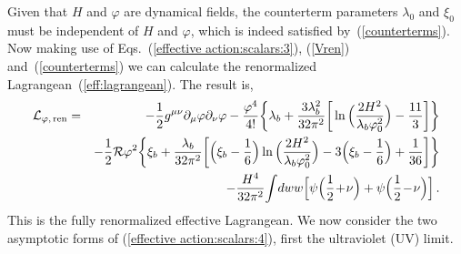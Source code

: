 \documentclass[aps,12pt,superscriptaddress,preprintnumbers,
                secnumarabic,nofootinbib,showpacs]{revtex4}
\begin{document}
Given that $H$ and $\varphi$ are dynamical fields, the counterterm parameters
$\lambda_0$ and $\xi_0$ must be independent of $H$ and $\varphi$,
which is indeed satisfied by~(\ref{counterterms}).
 Now making use of Eqs.~(\ref{effective action:scalars:3}),
(\ref{Vren}) and~(\ref{counterterms}) we can calculate the renormalized
Lagrangean~(\ref{eff:lagrangean}). The result is,
\begin{eqnarray}
 {\cal L}_{\varphi,\, \mathrm{ren}}
  &=& -\frac12g^{\mu\nu}\partial_\mu\varphi\partial_\nu\varphi
      - \frac{\varphi^4}{4!}\bigg\{\lambda_b+\frac{3\lambda_b^{2}}{32\pi^{2}}
      \bigg[\ln\Big(\frac{2H^{2}}{\lambda_b\varphi_0^{2}}\Big)-\frac{11}{3}\bigg]\bigg\}
\nonumber\\
  & &    - \frac12{\cal R}\varphi^2\bigg\{\xi_b+\frac{\lambda_b}{32\pi^{2}}\bigg[\Big(\xi_b-\frac{1}{6}\Big)
                       \ln\Big(\frac{2H^{2}}{\lambda_b\varphi_0^{2}}\Big)
                       -3\Big(\xi_b-\frac{1}{6}\Big)+\frac{1}{36}\bigg]\bigg\}
\nonumber
\\
&&\hskip 0.cm
     - \frac{H^4}{32\pi^2}
        \!\int\! dww
              \Big[\psi\Big(\frac{1}{2}\!+\!\nu\Big)
                              + \psi\Big(\frac{1}{2}\!-\!\nu\Big)\Big]
\,.
\label{effective action:scalars:4}
\end{eqnarray}
This is the fully renormalized effective Lagrangean. We now
consider the two asymptotic forms of (\ref{effective
action:scalars:4}), first the ultraviolet (UV) limit.
\end{document}
